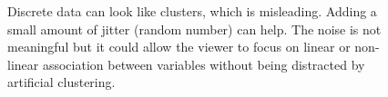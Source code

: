 \documentclass[
  letterpaper,
]{krantz}
\begin{document}
\begin{figure}

\begin{minipage}{0.50\linewidth}



\end{minipage}%
%
\begin{minipage}{0.50\linewidth}



\end{minipage}%

\caption{\label{fig-discrete-data-pdf}Discrete data can look like
clusters, which is misleading. Adding a small amount of jitter (random
number) can help. The noise is not meaningful but it could allow the
viewer to focus on linear or non-linear association between variables
without being distracted by artificial clustering. }

\end{figure}%
\end{document}
